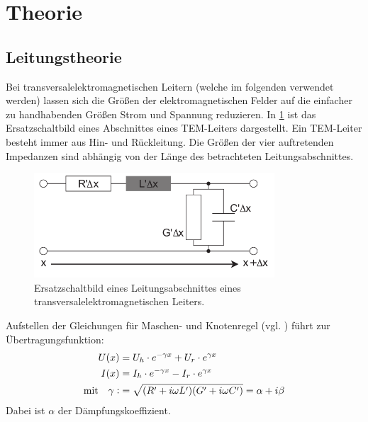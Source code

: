 \documentclass[
	a4paper,
	12pt,
	pagesize,
	ngerman
]{scrartcl}
\begin{document}
  \section{Theorie}


	\subsection{Leitungstheorie}

	Bei transversalelektromagnetischen Leitern (welche im folgenden verwendet werden) lassen sich die Größen der elektromagnetischen Felder auf die einfacher zu handhabenden Größen Strom und Spannung reduzieren.
	In \cref{fig_ersatzschaltbild} ist das Ersatzschaltbild eines Abschnittes eines TEM-Leiters dargestellt.
	Ein TEM-Leiter besteht immer aus Hin- und Rückleitung.
	Die Größen der vier auftretenden Impedanzen sind abhängig von der Länge des betrachteten Leitungsabschnittes.

	\begin{figure}[H]
		\includegraphics[width=0.8\textwidth]{img/ersatzschaltbild}
		\centering
		\caption{
			Ersatzschaltbild eines Leitungsabschnittes eines transversalelektromagnetischen Leiters. \cite{Anleitung}
		}
		\label{fig_ersatzschaltbild}
		\centering
	\end{figure}

	Aufstellen der Gleichungen für Maschen- und Knotenregel (vgl. \cite{Anleitung} ) führt zur Übertragungsfunktion:
	\begin{align}
		U(x) &= U_h \cdot e^{-\gamma x} + U_r \cdot e^{\gamma x}\\
		I(x) &= I_h \cdot e^{-\gamma x} - I_r \cdot e^{\gamma x}\\
		\text{mit} \quad \gamma \vcentcolon &= \sqrt{(R'+i \omega L')(G' +i \omega C')} = \alpha + i \beta
	\end{align}
	Dabei ist $\alpha $ der Dämpfungskoeffizient.
\end{document}
